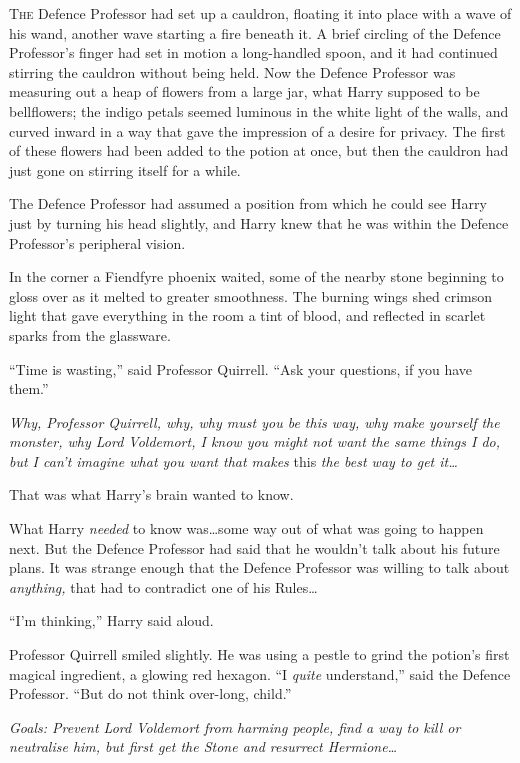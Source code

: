
\lettrine{T}{he} Defence
Professor had set up a cauldron, floating it into place with a wave of his
wand, another wave starting a fire beneath it. A brief circling of the Defence
Professor’s finger had set in motion a long-handled spoon, and it had continued
stirring the cauldron without being held. Now the Defence Professor was
measuring out a heap of flowers from a large jar, what Harry supposed to be
bellflowers; the indigo petals seemed luminous in the white light of the walls,
and curved inward in a way that gave the impression of a desire for privacy.
The first of these flowers had been added to the potion at once, but then the
cauldron had just gone on stirring itself for a while.

The Defence Professor had assumed a position from which he could see Harry just
by turning his head slightly, and Harry knew that he was within the Defence
Professor’s peripheral vision.

In the corner a Fiendfyre phoenix waited, some of the nearby stone beginning to
gloss over as it melted to greater smoothness. The burning wings shed crimson
light that gave everything in the room a tint of blood, and reflected in
scarlet sparks from the glassware.

“Time is wasting,” said Professor Quirrell. “Ask your questions, if you have
them.”

\emph{Why, Professor Quirrell, why, why must you be this way, why make yourself
the monster, why Lord Voldemort, I know you might not want the same things I
do, but I can’t imagine what you want that makes} this \emph{the best way to
get it…}

That was what Harry’s brain wanted to know.

What Harry \emph{needed} to know was…some way out of what was going to
happen next. But the Defence Professor had said that he wouldn’t talk about his
future plans. It was strange enough that the Defence Professor was willing to
talk about \emph{anything,} that had to contradict one of his Rules…

“I’m thinking,” Harry said aloud.

Professor Quirrell smiled slightly. He was using a pestle to grind the potion’s
first magical ingredient, a glowing red hexagon. “I \emph{quite} understand,”
said the Defence Professor. “But do not think over-long, child.”

\emph{Goals: Prevent Lord Voldemort from harming people, find a way to kill or
neutralise him, but first get the Stone and resurrect Hermione…}

